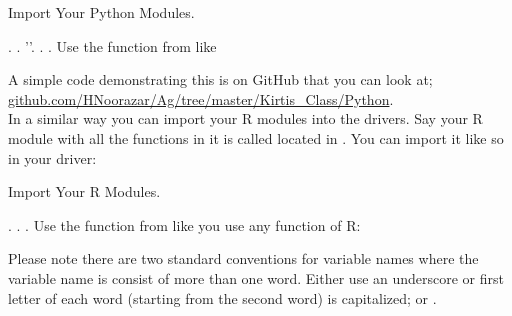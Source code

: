 \begin{tcolorbox}
  \begin{algorithm}[H]
  \label{alg:importPythonCode}
   \caption{Import Your Python Modules.}
.  . ''\code{)}.     .     . Use the function  from  like \\
\end{algorithm}
\end{tcolorbox}
A simple code demonstrating this is on GitHub that you can look at;
\href{https://github.com/HNoorazar/Ag/tree/master/Kirtis\_Class/Python}{github.com/HNoorazar/Ag/tree/master/Kirtis\_Class/Python}.\\

In a similar way you can import your R modules into the drivers.
Say your R module with all the functions in it is called 
located in .
You can import it like so in your driver:

\begin{tcolorbox}
  \begin{algorithm}[H]
  \label{alg:importRCode}
   \caption{Import Your R Modules.}
.   .  . Use the function  from  like you use any function of R: \\
\end{algorithm}
\end{tcolorbox}


\begin{rem}
Please note there are two standard conventions for 
variable names where the variable name is consist of
more than one word. Either use an underscore or first
letter of each word (starting from the second word) is capitalized;
 or .
\end{rem}







